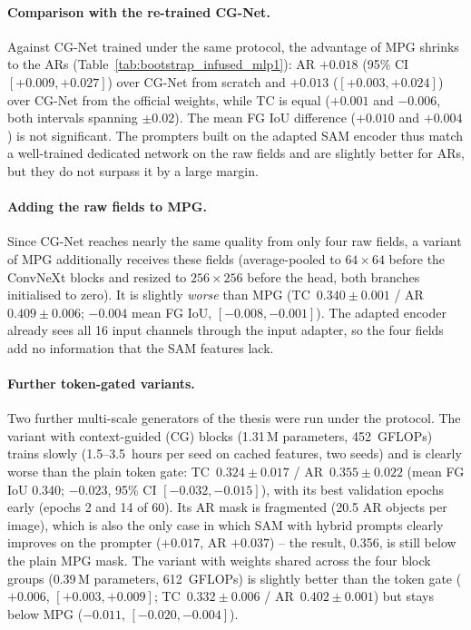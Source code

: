 \paragraph{Comparison with the re-trained CG-Net.} Against CG-Net trained under the same protocol, the advantage of
MPG shrinks to the ARs (Table~\ref{tab:bootstrap_infused_mlp1}): AR $+0.018$ (95\% CI $[+0.009,+0.027]$) over CG-Net
from scratch and $+0.013$ ($[+0.003,+0.024]$) over CG-Net from the official weights, while TC is equal ($+0.001$ and
$-0.006$, both intervals spanning $\pm0.02$). The mean FG IoU difference ($+0.010$ and $+0.004$) is not significant.
The prompters built on the adapted SAM encoder thus match a well-trained dedicated network on the raw fields and are
slightly better for ARs, but they do not surpass it by a large margin.

\paragraph{Adding the raw fields to MPG.} Since CG-Net reaches nearly the same quality from only four raw fields, a
variant of MPG additionally receives these fields (average-pooled to $64\times64$ before the ConvNeXt blocks and resized
to $256\times256$ before the head, both branches initialised to zero). It is slightly \emph{worse} than MPG
(TC~$0.340\pm0.001$ / AR~$0.409\pm0.006$; $-0.004$ mean FG IoU, $[-0.008,-0.001]$). The adapted encoder already sees
all 16 input channels through the input adapter, so the four fields add no information that the SAM features lack.

\paragraph{Further token-gated variants.} Two further multi-scale generators of the thesis were run under the protocol.
The variant with context-guided (CG) blocks (1.31\,M parameters, 452~GFLOPs) trains slowly (1.5--3.5~hours per seed
on cached features, two seeds) and is clearly worse than the plain token gate: TC~$0.324\pm0.017$ /
AR~$0.355\pm0.022$ (mean FG IoU 0.340; $-0.023$, 95\% CI $[-0.032,-0.015]$), with its best validation epochs early
(epochs 2 and 14 of 60). Its AR mask is fragmented (20.5 AR objects per image), which is also the only case in which
SAM with hybrid prompts clearly improves on the prompter ($+0.017$, AR $+0.037$) -- the result, 0.356, is still below
the plain MPG mask. The variant with weights shared across the four block groups (0.39\,M parameters, 612~GFLOPs) is
slightly better than the token gate ($+0.006$, $[+0.003,+0.009]$; TC~$0.332\pm0.006$ / AR~$0.402\pm0.001$) but stays
below MPG ($-0.011$, $[-0.020,-0.004]$).

